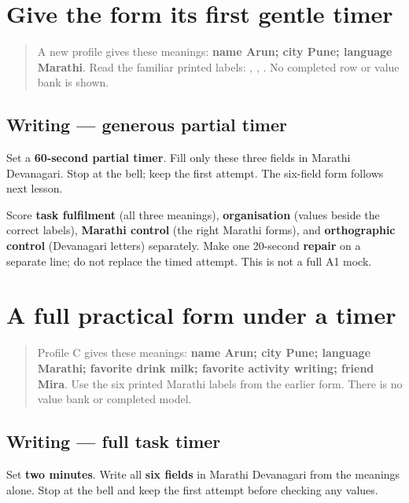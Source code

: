 \section[partial-timer practical form]{Give the form its first gentle timer}

\label{lesson:MR-A1F14-partial-timer}



\begin{quote}
A new profile gives these meanings: \textbf{name Arun; city Pune; language Marathi}. Read the familiar printed labels: , , . No completed row or value bank is shown.
\end{quote}

\subsection*{Writing — generous partial timer}
Set a \textbf{60-second partial timer}. Fill only these three fields in Marathi Devanagari. Stop at the bell; keep the first attempt. The six-field form follows next lesson.

\begin{tcolorbox}[breakable,colback=teal!4,colframe=teal!35!black,title={Before you move on}]
Score \textbf{task fulfilment} (all three meanings), \textbf{organisation} (values beside the correct labels), \textbf{Marathi control} (the right Marathi forms), and \textbf{orthographic control} (Devanagari letters) separately. Make one 20-second \textbf{repair} on a separate line; do not replace the timed attempt. This is not a full A1 mock.
\end{tcolorbox}
\section[timed six-field practical form]{A full practical form under a timer}

\label{lesson:MR-A1F15-timed-form}



\begin{quote}
Profile C gives these meanings: \textbf{name Arun; city Pune; language Marathi; favorite drink milk; favorite activity writing; friend Mira}. Use the six printed Marathi labels from the earlier form. There is no value bank or completed model.
\end{quote}

\subsection*{Writing — full task timer}
Set \textbf{two minutes}. Write all \textbf{six fields} in Marathi Devanagari from the meanings alone. Stop at the bell and keep the first attempt before checking any values.

